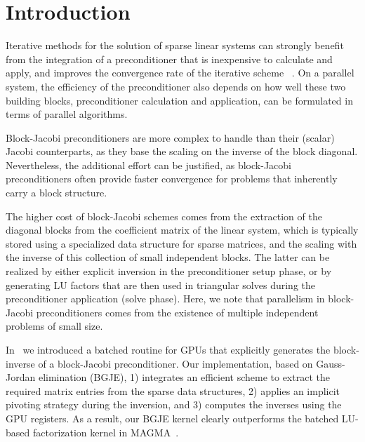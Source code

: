 \section{Introduction}
\label{2017-gh-block-jacobi:sec:s1-intro}

Iterative methods for the solution of sparse linear systems can strongly benefit from the integration of a
preconditioner that is inexpensive to calculate
and apply,
and improves the convergence rate of the iterative scheme
~\cite{saad}.
On a parallel system, 
the efficiency of the preconditioner 
also depends on how well 
these two building blocks, 
preconditioner calculation and application, can be formulated in terms of parallel %
algorithms.

Block-Jacobi preconditioners are more complex to handle than their (scalar) Jacobi counterparts, as they
base the scaling on the inverse of the block diagonal. Nevertheless, 
the additional effort can be justified, as block-Jacobi preconditioners often provide faster convergence 
for problems that inherently carry a block structure.

The higher cost of block-Jacobi schemes comes from the extraction of 
the diagonal blocks from the coefficient matrix of the linear system,
which is typically stored using a specialized data structure for sparse matrices,
and the scaling with the inverse of this collection of small independent blocks.
The latter can be realized by either explicit inversion in the preconditioner setup phase,
or by generating LU factors that are then used in triangular solves during the preconditioner application (solve phase).
Here, we note that parallelism in block-Jacobi preconditioners comes from
the existence of multiple independent problems of small size.

In~\cite{gje} we introduced a batched routine for GPUs that 
explicitly generates the block-inverse of a block-Jacobi preconditioner.
Our implementation, based on Gauss-Jordan elimination (BGJE),
1) integrates an efficient scheme to extract the required matrix entries from the sparse data structures,
2) applies an implicit pivoting strategy during the inversion,
and 3) computes the inverses using the GPU registers.
As a result, our BGJE kernel
clearly outperforms the batched LU-based factorization kernel in
MAGMA~\cite{magma}.


